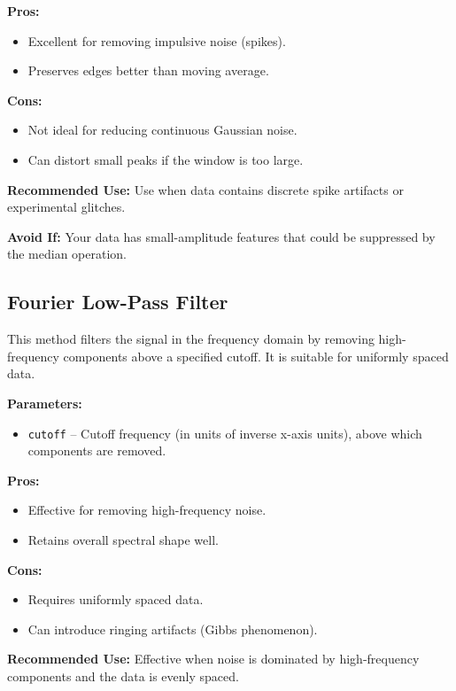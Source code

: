\textbf{Pros:}
\begin{itemize}
    \item Excellent for removing impulsive noise (spikes).
    \item Preserves edges better than moving average.
\end{itemize}

\textbf{Cons:}
\begin{itemize}
    \item Not ideal for reducing continuous Gaussian noise.
    \item Can distort small peaks if the window is too large.
\end{itemize}

\textbf{Recommended Use:}  
Use when data contains discrete spike artifacts or experimental glitches.

\textbf{Avoid If:}  
Your data has small-amplitude features that could be suppressed by the median operation.

\subsection{Fourier Low-Pass Filter}

This method filters the signal in the frequency domain by removing high-frequency components above a specified cutoff. It is suitable for uniformly spaced data.

\textbf{Parameters:}
\begin{itemize}
    \item \texttt{cutoff} – Cutoff frequency (in units of inverse x-axis units), above which components are removed.
\end{itemize}

\textbf{Pros:}
\begin{itemize}
    \item Effective for removing high-frequency noise.
    \item Retains overall spectral shape well.
\end{itemize}

\textbf{Cons:}
\begin{itemize}
    \item Requires uniformly spaced data.
    \item Can introduce ringing artifacts (Gibbs phenomenon).
\end{itemize}

\textbf{Recommended Use:}  
Effective when noise is dominated by high-frequency components and the data is evenly spaced.


